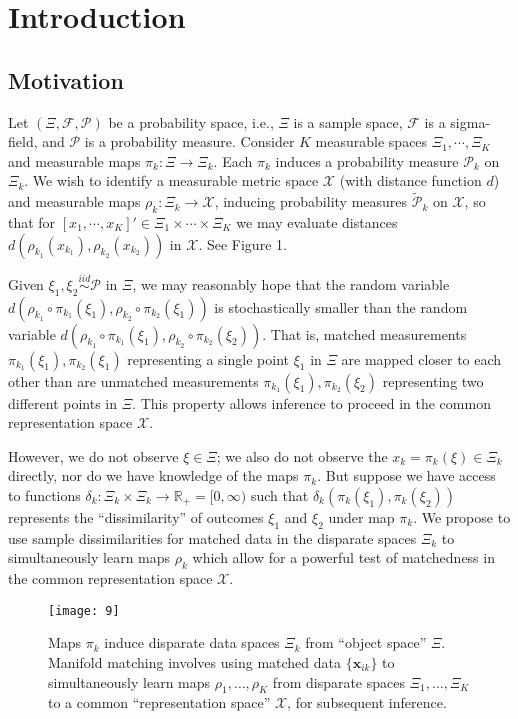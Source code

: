 \documentclass[12pt,xcolor]{article}
\newcommand{\1}{\ensuremath{\mbox{{\bf 1}}}}
\newcommand{\mX}{\mathcal{X}}
\newcommand{\mF}{\mathcal{F}}
\newcommand{\mP}{\mathcal{P}}
\newcommand{\iid}{\stackrel{iid}{\sim}}
\begin{document}
\section{Introduction}

\subsection{Motivation}

Let $(\Xi,\mF,\mP)$ be a probability space,
i.e., $\Xi$ is a sample space, $\mF$ is a sigma-field,
and $\mP$ is a probability measure.
Consider $K$ measurable spaces $\Xi_1,\cdots,\Xi_K$ 
and measurable maps $\pi_k:\Xi \to \Xi_k$.
Each $\pi_k$ induces a probability measure $\mP_k$ on $\Xi_k$.
We wish to identify a measurable metric space $\mX$
(with distance function $d$)
and measurable maps $\rho_k: \Xi_k \to \mX$,
inducing probability measures $\widetilde{\mP}_k$ on $\mX$,
so that for $[x_1,\cdots,x_K]' \in \Xi_1 \times \cdots \times \Xi_K$
we may evaluate distances $d(\rho_{k_1}(x_{k_1}),\rho_{k_2}(x_{k_2}))$ in $\mX$.
See Figure 1.

Given $\xi_1,\xi_2 \iid \mP$ in $\Xi$,
we may reasonably hope that the random variable
$d(\rho_{k_1}\circ\pi_{k_1}(\xi_1),\rho_{k_2}\circ\pi_{k_2}(\xi_1))$
is stochastically smaller than the random variable
$d(\rho_{k_1}\circ\pi_{k_1}(\xi_1),\rho_{k_2}\circ\pi_{k_2}(\xi_2))$.
That is, matched measurements 
$\pi_{k_1}(\xi_1),\pi_{k_2}(\xi_1)$
representing a single point $\xi_1$ in $\Xi$
are mapped closer to each other than are
unmatched measurements 
$\pi_{k_1}(\xi_1),\pi_{k_2}(\xi_2)$
representing two different points in $\Xi$.
This property allows inference to proceed in the common representation space $\mX$.

However, 
we do not observe $\xi \in \Xi$;
we also do not observe the $x_k = \pi_k(\xi) \in \Xi_k$ directly,
nor do we have knowledge of the maps $\pi_k$.
But suppose we have access to functions 
$\delta_k:\Xi_k \times \Xi_k \to \mathbb{R}_+ = [0,\infty)$
such that $\delta_k( \pi_k(\xi_1) , \pi_k(\xi_2) )$
represents the ``dissimilarity'' of outcomes $\xi_1$ and $\xi_2$
under map $\pi_k$.
We propose to use sample dissimilarities for matched data in the disparate spaces $\Xi_k$
to simultaneously learn maps $\rho_k$ which allow for a powerful test of matchedness
in the common representation space $\mX$.

\begin{figure}[h]
  \begin{center}
    \texttt{[image: 9]}
    \caption{Maps $\pi_k$ induce disparate data spaces $\Xi_k$ from ``object space'' $\Xi$.
    Manifold matching involves using matched data $\{\bm{x}_{ik}\}$
    to simultaneously learn maps $\rho_1,\ldots,\rho_K$
    from disparate spaces 
    $\Xi_1,\ldots,\Xi_K$
	to a common ``representation space'' $\mX$, for subsequent inference.}\label{fig:mm}
  \end{center}
  \end{figure}
\end{document}
